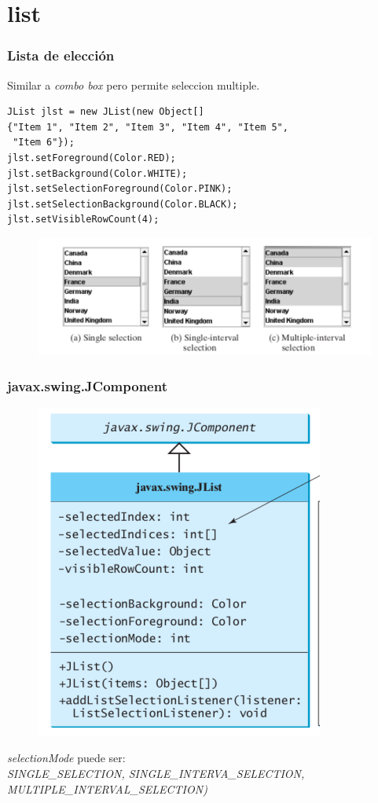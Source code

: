 \documentclass{beamer}
\begin{document}
\section{list}
\begin{frame}[fragile]
\frametitle{Lista de elección}
Similar a \emph{combo box} pero permite seleccion multiple.
\begin{verbatim}
JList jlst = new JList(new Object[]
{"Item 1", "Item 2", "Item 3", "Item 4", "Item 5",
 "Item 6"});
jlst.setForeground(Color.RED);
jlst.setBackground(Color.WHITE);
jlst.setSelectionForeground(Color.PINK);
jlst.setSelectionBackground(Color.BLACK);
jlst.setVisibleRowCount(4);
\end{verbatim}
\begin{figure}
\includegraphics[scale=0.7]{imagenes/list1.png} 
\end{figure} 
\end{frame}

\begin{frame}
\frametitle{javax.swing.JComponent} 
\begin{figure}
\includegraphics[scale=0.5]{imagenes/list2.png} 
\end{figure} 
\emph{selectionMode} puede ser:\\ \emph{SINGLE\_SELECTION, SINGLE\_INTERVA\_SELECTION, MULTIPLE\_INTERVAL\_SELECTION)}
\end{frame}
\end{document}

